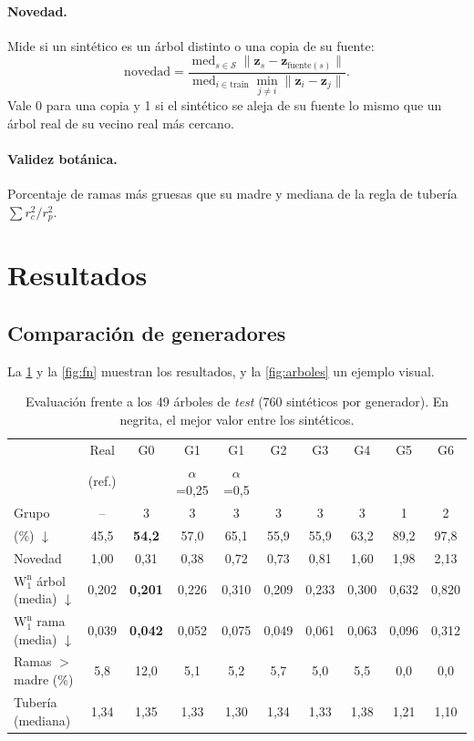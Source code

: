 \documentclass[11pt,a4paper]{article}
\newcommand{\Wn}{\mathrm{W}_1^{\mathrm{n}}}
\newcommand{\NNA}{\text{1-NNA}}
\begin{document}
\paragraph{Novedad.} Mide si un sintético es un árbol distinto o una copia de su fuente:
\begin{equation}
\text{novedad} = \frac{\operatorname{med}_{s\in\mathcal{S}} \lVert \mathbf{z}_s - \mathbf{z}_{\text{fuente}(s)} \rVert}{\operatorname{med}_{i\in\text{train}} \min_{j\neq i} \lVert \mathbf{z}_i - \mathbf{z}_j\rVert}.
\end{equation}
Vale 0 para una copia y 1 si el sintético se aleja de su fuente lo mismo que un árbol real de su vecino real más cercano.

\paragraph{Validez botánica.} Porcentaje de ramas más gruesas que su madre y mediana de la regla de tubería $\sum r_c^2/r_p^2$.

\section{Resultados}

\subsection{Comparación de generadores}
La \cref{tab:res} y la \cref{fig:fn} muestran los resultados, y la \cref{fig:arboles} un ejemplo visual.

\begin{table}[t]
\centering
\caption{Evaluación frente a los 49 árboles de \emph{test} (760 sintéticos por generador). En negrita, el mejor valor entre los sintéticos.}
\label{tab:res}
\small
\setlength{\tabcolsep}{4pt}
\begin{tabular}{lccccccccc}
\toprule
 & Real & G0 & G1 & G1 & G2 & G3 & G4 & G5 & G6 \\
 & (ref.) & & $\alpha$=0,25 & $\alpha$=0,5 & & & & & \\
\midrule
Grupo & -- & 3 & 3 & 3 & 3 & 3 & 3 & 1 & 2 \\
\NNA{} (\%) $\downarrow$ & 45,5 & \textbf{54,2} & 57,0 & 65,1 & 55,9 & 55,9 & 63,2 & 89,2 & 97,8 \\
Novedad & 1,00 & 0,31 & 0,38 & 0,72 & 0,73 & 0,81 & 1,60 & 1,98 & 2,13 \\
$\Wn$ árbol (media) $\downarrow$ & 0,202 & \textbf{0,201} & 0,226 & 0,310 & 0,209 & 0,233 & 0,300 & 0,632 & 0,820 \\
$\Wn$ rama (media) $\downarrow$ & 0,039 & \textbf{0,042} & 0,052 & 0,075 & 0,049 & 0,061 & 0,063 & 0,096 & 0,312 \\
Ramas $>$ madre (\%) & 5,8 & 12,0 & 5,1 & 5,2 & 5,7 & 5,0 & 5,5 & 0,0 & 0,0 \\
Tubería (mediana) & 1,34 & 1,35 & 1,33 & 1,30 & 1,34 & 1,33 & 1,38 & 1,21 & 1,10 \\
\bottomrule
\end{tabular}
\end{table}
\end{document}
